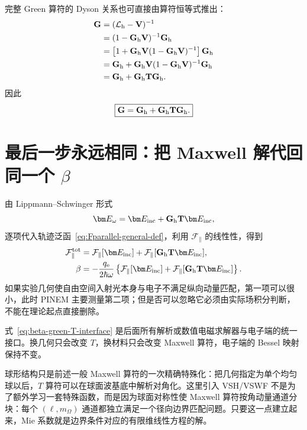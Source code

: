 完整 Green 算符的 Dyson 关系也可直接由算符恒等式推出：
\begin{align}
\mathbf G
&=(\mathcal L_{\rm h}-\mathbf V)^{-1}\\
&=(1-\mathbf G_{\rm h}\mathbf V)^{-1}\mathbf G_{\rm h}\\
&=\left[1+\mathbf G_{\rm h}\mathbf V(1-\mathbf G_{\rm h}\mathbf V)^{-1}\right]\mathbf G_{\rm h}\\
&=\mathbf G_{\rm h}
+\mathbf G_{\rm h}\mathbf V(1-\mathbf G_{\rm h}\mathbf V)^{-1}\mathbf G_{\rm h}\\
&=\mathbf G_{\rm h}+\mathbf G_{\rm h}\mathbf T\mathbf G_{\rm h}.
\end{align}
因此
\begin{equation}
\boxed{
\mathbf G=\mathbf G_{\rm h}+\mathbf G_{\rm h}\mathbf T\mathbf G_{\rm h}.}
\label{eq:Dyson_T}
\end{equation}




\section{最后一步永远相同：把 Maxwell 解代回同一个 $\beta$}
由 Lippmann--Schwinger 形式
\begin{equation}
\bm E_\omega=\bm E_{\rm inc}+\mathbf G_{\rm h}\mathbf T\bm E_{\rm inc},
\end{equation}
逐项代入轨迹泛函~\eqref{eq:Fparallel-general-def}，利用 $\mathcal F_{\parallel}$ 的线性性，得到
\begin{align}
\mathcal F_{\parallel}^{\rm tot}
&=\mathcal F_{\parallel}[\bm E_{\rm inc}]
 +\mathcal F_{\parallel}[\mathbf G_{\rm h}\mathbf T\bm E_{\rm inc}],\\
\beta
&=-\frac{q_{\rm e}}{2\hbar\omega}
\left\{
\mathcal F_{\parallel}[\bm E_{\rm inc}]
+\mathcal F_{\parallel}[\mathbf G_{\rm h}\mathbf T\bm E_{\rm inc}]
\right\}.
\label{eq:beta-green-T-interface}
\end{align}
如果实验几何使自由空间入射光本身与电子不满足纵向动量匹配，第一项可以很小，此时 PINEM 主要测量第二项；但是否可以忽略它必须由实际场积分判断，不能在理论起点直接删除。

式~\eqref{eq:beta-green-T-interface} 是后面所有解析或数值电磁求解器与电子端的统一接口。换几何只会改变 $T$，换材料只会改变 Maxwell 算符，电子端的 Bessel 映射保持不变。


球形结构只是前述一般 Maxwell 算符的一次精确特殊化：把几何指定为单个均匀球以后，$T$ 算符可以在球面波基底中解析对角化。这里引入 VSH/VSWF 不是为了额外学习一套特殊函数，而是因为球面对称性使 Maxwell 算符按角动量通道分块：每个 $(\ell,m_\Omega)$ 通道都独立满足一个径向边界匹配问题。只要这一点建立起来，Mie 系数就是边界条件对应的有限维线性方程的解。

